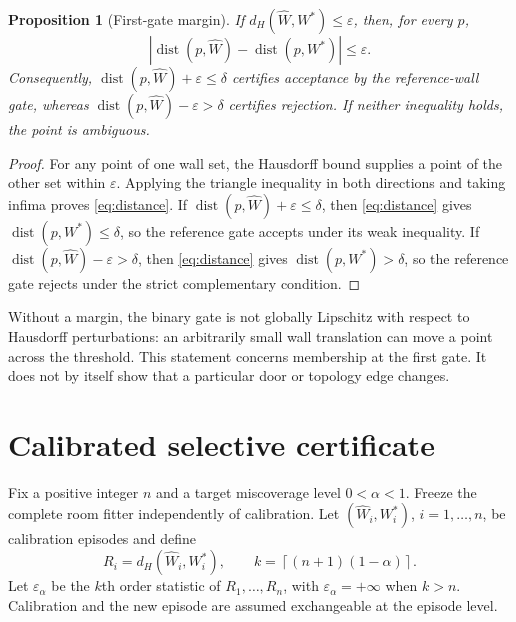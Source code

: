 \documentclass{article}
\newtheorem{proposition}{Proposition}
\DeclareMathOperator{\dist}{dist}
\begin{document}
\begin{proposition}[First-gate margin]
If $d_H(\widehat W,W^*)\leq\varepsilon$, then, for every $p$,
\begin{equation}
 \left|\dist(p,\widehat W)-\dist(p,W^*)\right|\leq\varepsilon.
 \label{eq:distance}
\end{equation}
Consequently, $\dist(p,\widehat W)+\varepsilon\leq\delta$ certifies acceptance by the reference-wall gate, whereas $\dist(p,\widehat W)-\varepsilon>\delta$ certifies rejection. If neither inequality holds, the point is ambiguous.
\end{proposition}

\begin{proof}
For any point of one wall set, the Hausdorff bound supplies a point of the other set within $\varepsilon$. Applying the triangle inequality in both directions and taking infima proves \eqref{eq:distance}. If $\dist(p,\widehat W)+\varepsilon\leq\delta$, then \eqref{eq:distance} gives $\dist(p,W^*)\leq\delta$, so the reference gate accepts under its weak inequality. If $\dist(p,\widehat W)-\varepsilon>\delta$, then \eqref{eq:distance} gives $\dist(p,W^*)>\delta$, so the reference gate rejects under the strict complementary condition.
\end{proof}

Without a margin, the binary gate is not globally Lipschitz with respect to Hausdorff perturbations: an arbitrarily small wall translation can move a point across the threshold. This statement concerns membership at the first gate. It does not by itself show that a particular door or topology edge changes.

\section{Calibrated selective certificate}

Fix a positive integer $n$ and a target miscoverage level $0<\alpha<1$. Freeze the complete room fitter independently of calibration. Let
$(\widehat W_i,W_i^*)$, $i=1,\ldots,n$, be calibration episodes and define
\begin{equation}
 R_i=d_H(\widehat W_i,W_i^*), \qquad
 k=\left\lceil(n+1)(1-\alpha)\right\rceil.
 \label{eq:scores}
\end{equation}
Let $\varepsilon_\alpha$ be the $k$th order statistic of $R_1,\ldots,R_n$, with $\varepsilon_\alpha=+\infty$ when $k>n$. Calibration and the new episode are assumed exchangeable at the episode level.
\end{document}
